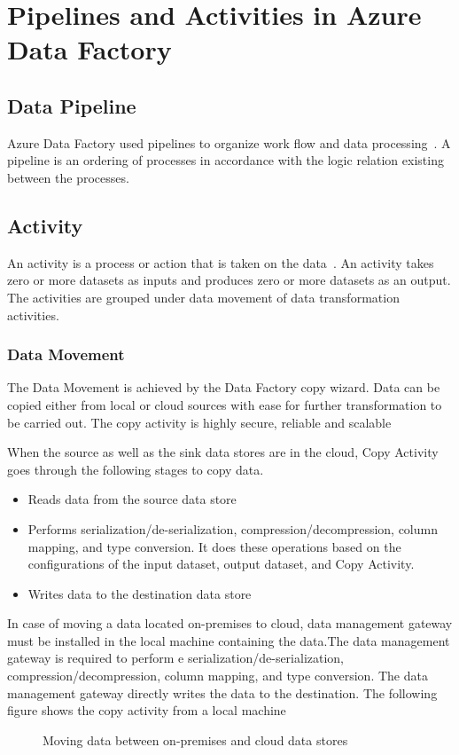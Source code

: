 \documentclass[9pt,twocolumn,twoside]{styles/osajnl}
\begin{document}
\section{Pipelines and Activities in Azure Data Factory}
\subsection{Data Pipeline}
Azure Data Factory used pipelines to organize work flow and data processing~\cite{www-microsoft-azure-pipelines}. A pipeline is an ordering of processes in accordance with the logic relation existing between the processes. 

\subsection{Activity} 
An activity is a process or action that is taken on the data~\cite{www-microsoft-azure-pipelines}. An activity takes zero or more datasets as inputs and produces zero or more datasets as an output. The activities are grouped under data movement of data transformation activities.

\subsubsection{Data Movement}
The Data Movement is achieved by the Data Factory copy wizard. Data can be copied either from local or cloud sources with ease for further transformation to be carried out. The copy activity is highly secure, reliable and scalable

When the source as well as the sink data stores are in the cloud, Copy Activity goes through the following stages to copy data. 
\begin{itemize}
    \item Reads data from the source data store\item Performs serialization/de-serialization, compression/decompression, column mapping, and type conversion. It does these operations based on the configurations of the input dataset, output dataset, and Copy Activity.\item Writes data to the destination data store
\end{itemize}

In case of moving a data located on-premises to cloud, data management gateway must be installed in the local machine containing the data.The data management gateway is required to perform e serialization/de-serialization, compression/decompression, column mapping, and type conversion. The data management gateway directly writes the data to the destination. The following figure shows the copy activity from a local machine
\begin{figure}[htbp]
\centering
{}
\caption{Moving data between on-premises and cloud data stores~\cite{www-microsoft-azure-copy}}
\label{fig:copy-local}
\end{figure}
\end{document}
